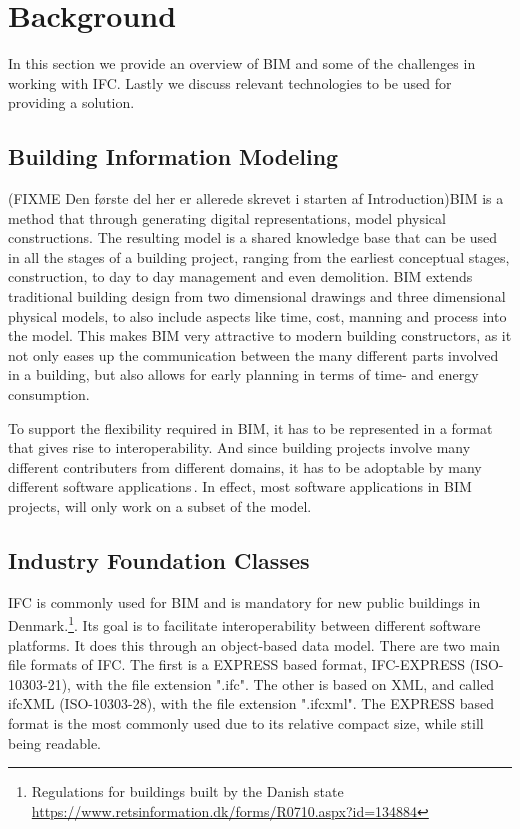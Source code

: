 \section{Background}
\label{sec:background}
In this section we provide an overview of BIM and some of the challenges in working with IFC. Lastly we discuss relevant technologies to be used for providing a solution.
\subsection{Building Information Modeling}

\label{sec:building_information_modeling}
(FIXME Den første del her er allerede skrevet i starten af Introduction)BIM is a method that through generating digital representations, model physical constructions. The resulting model is a shared knowledge base that can be used in all the stages of a building project, ranging from the earliest conceptual stages, construction, to day to day management and even demolition. BIM extends traditional building design from two dimensional drawings and three dimensional physical models, to also include aspects like time, cost, manning and process into the model. This makes BIM very attractive to modern building constructors, as it not only eases up the communication between the many different parts involved in a building, but also allows for early planning in terms of time- and energy consumption.

To support the flexibility required in BIM, it has to be represented in a format that gives rise to interoperability. And since building projects involve many different contributers from different domains, it has to be adoptable by many different software applications\,\cite{quteprints37725}. In effect, most software applications in BIM projects, will only work on a subset of the model.
\subsection{Industry Foundation Classes}
IFC is commonly used for BIM and is mandatory for new public buildings in Denmark.\footnote{Regulations for buildings built by the Danish state \url{https://www.retsinformation.dk/forms/R0710.aspx?id=134884}}. Its goal is to facilitate interoperability between different software platforms. It does this through an object-based data model. There are two main file formats of IFC. The first is a EXPRESS based format, IFC-EXPRESS (ISO-10303-21), with the file extension ".ifc". The other is based on XML, and called ifcXML (ISO-10303-28), with the file extension ".ifcxml". The EXPRESS based format is the most commonly used due to its relative compact size, while still being readable.

